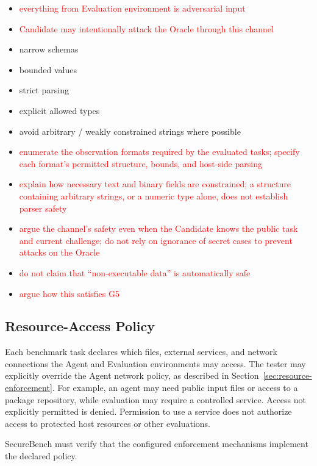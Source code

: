 \documentclass[conference]{IEEEtran}
\newcommand{\draft}[1]{%
    \par\noindent
    {\color{gray}\small #1}
    \par
}
\newcommand{\teacher}[1]{\textcolor{red}{#1}}
\begin{document}
\draft{
\begin{itemize}
    \item \teacher{everything from Evaluation environment is adversarial input}
    \item \teacher{Candidate may intentionally attack the Oracle through this channel}
    \item narrow schemas
    \item bounded values
    \item strict parsing
    \item explicit allowed types
    \item avoid arbitrary / weakly constrained strings where possible
    \item \teacher{enumerate the observation formats required by the evaluated tasks; specify each format's permitted structure, bounds, and host-side parsing}
    \item \teacher{explain how necessary text and binary fields are constrained; a structure containing arbitrary strings, or a numeric type alone, does not establish parser safety}
    \item \teacher{argue the channel's safety even when the Candidate knows the public task and current challenge; do not rely on ignorance of secret cases to prevent attacks on the Oracle}
    \item \teacher{do not claim that ``non-executable data'' is automatically safe}
    \item \teacher{argue how this satisfies G5}
\end{itemize}
}

\subsection{Resource-Access Policy}


Each benchmark task declares which files, external services, and network connections the Agent and Evaluation environments may access. The tester may explicitly override the Agent network policy, as described in Section~\ref{sec:resource-enforcement}. For example, an agent may need public input files or access to a package repository, while evaluation may require a controlled service. Access not explicitly permitted is denied. Permission to use a service does not authorize access to protected host resources or other evaluations.

SecureBench must verify that the configured enforcement mechanisms implement the declared policy.
\end{document}

